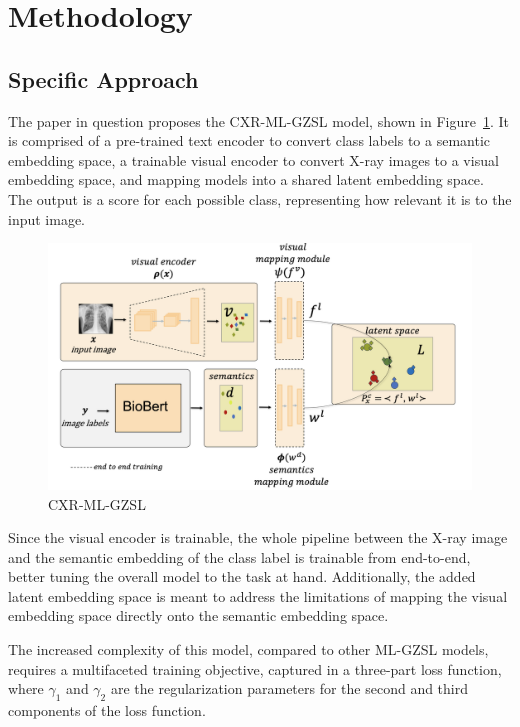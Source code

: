 \documentclass[letterpaper]{article} %
\begin{document}
\section{Methodology}

\subsection{Specific Approach}

The paper in question proposes the CXR-ML-GZSL model, shown in Figure~\ref{fig:model}. It is comprised of a pre-trained text encoder to convert class labels to a semantic embedding space, a trainable visual encoder to convert X-ray images to a visual embedding space, and mapping models into a shared latent embedding space. The output is a score for each possible class, representing how relevant it is to the input image.

\begin{figure}[h!]
\centering
\includegraphics[width=0.9\columnwidth]{model.png}
\caption{CXR-ML-GZSL \cite{hayat2021multilabel}}
\label{fig:model}
\end{figure}

Since the visual encoder is trainable, the whole pipeline between the X-ray image and the semantic embedding of the class label is trainable from end-to-end, better tuning the overall model to the task at hand. Additionally, the added latent embedding space is meant to address the limitations of mapping the visual embedding space directly onto the semantic embedding space.

The increased complexity of this model, compared to other ML-GZSL models, requires a multifaceted training objective, captured in a three-part loss function, where $\gamma_1$ and $\gamma_2$ are the regularization parameters for the second and third components of the loss function.
\end{document}
